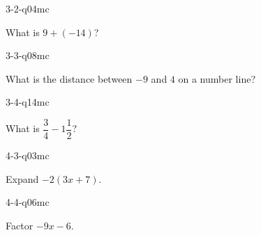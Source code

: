 \begin{practiceQuestion}{3-2-q04}{mc}
\begin{questionText}
What is $9 + (-14)$?
\end{questionText}
\end{practiceQuestion}

\begin{practiceQuestion}{3-3-q08}{mc}
\begin{questionText}
What is the distance between $-9$ and $4$ on a number line?
\end{questionText}
\end{practiceQuestion}

\begin{practiceQuestion}{3-4-q14}{mc}
\begin{questionText}
What is $\dfrac{3}{4} - 1\dfrac{1}{2}$?
\end{questionText}
\end{practiceQuestion}

\begin{practiceQuestion}{4-3-q03}{mc}
\begin{questionText}
Expand $-2(3x + 7)$.
\end{questionText}
\end{practiceQuestion}

\begin{practiceQuestion}{4-4-q06}{mc}
\begin{questionText}
Factor $-9x - 6$.
\end{questionText}
\end{practiceQuestion}

